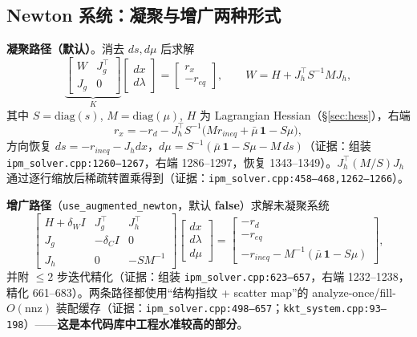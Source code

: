 \documentclass[11pt,a4paper]{ctexart}
\newcommand{\file}[1]{\texttt{#1}}
\newcommand{\opt}[1]{\texttt{#1}}
\newcommand{\evid}[1]{{\footnotesize\color{black!70}（证据：#1）}}
\begin{document}
\subsection{Newton 系统：凝聚与增广两种形式}
\textbf{凝聚路径（默认）}。消去 $ds,d\mu$ 后求解
\begin{equation}
\underbrace{\begin{bmatrix} W & J_g^{\top} \\ J_g & 0 \end{bmatrix}}_{K}
\begin{bmatrix} dx \\ d\lambda \end{bmatrix}
=
\begin{bmatrix} r_x \\ -r_{eq} \end{bmatrix},\qquad
W = H + J_h^{\top} S^{-1} M J_h ,
\end{equation}
其中 $S=\mathrm{diag}(s)$, $M=\mathrm{diag}(\mu)$, $H$ 为 Lagrangian Hessian（\S\ref{sec:hess}），右端
\begin{equation}
r_x = -r_d - J_h^{\top} S^{-1}\big(M r_{ineq} + \bar\mu\,\mathbf{1} - S\mu\big),
\end{equation}
方向恢复 $ds = -r_{ineq} - J_h dx$，$d\mu = S^{-1}(\bar\mu\,\mathbf{1} - S\mu - M\,ds)$\evid{组装 \file{ipm\_solver.cpp:1260--1267}，右端 1286--1297，恢复 1343--1349}。$J_h^{\top}(M/S)J_h$ 通过逐行缩放后稀疏转置乘得到\evid{\file{ipm\_solver.cpp:458--468,1262--1266}}。

\textbf{增广路径}（\opt{use\_augmented\_newton}，默认 \textbf{false}）求解未凝聚系统
\begin{equation}
\begin{bmatrix} H+\delta_W I & J_g^{\top} & J_h^{\top} \\
J_g & -\delta_C I & 0 \\
J_h & 0 & -S M^{-1} \end{bmatrix}
\begin{bmatrix} dx\\ d\lambda\\ d\mu \end{bmatrix}
=
\begin{bmatrix} -r_d \\ -r_{eq} \\ -r_{ineq} - M^{-1}(\bar\mu\,\mathbf{1}-S\mu) \end{bmatrix},
\end{equation}
并附 $\le 2$ 步迭代精化\evid{组装 \file{ipm\_solver.cpp:623--657}，右端 1232--1238，精化 661--683}。两条路径都使用``结构指纹 + scatter map''的 analyze-once/fill-$O(\mathrm{nnz})$ 装配缓存\evid{\file{ipm\_solver.cpp:498--657}；\file{kkt\_system.cpp:93--198}}——\textbf{这是本代码库中工程水准较高的部分}。
\end{document}
